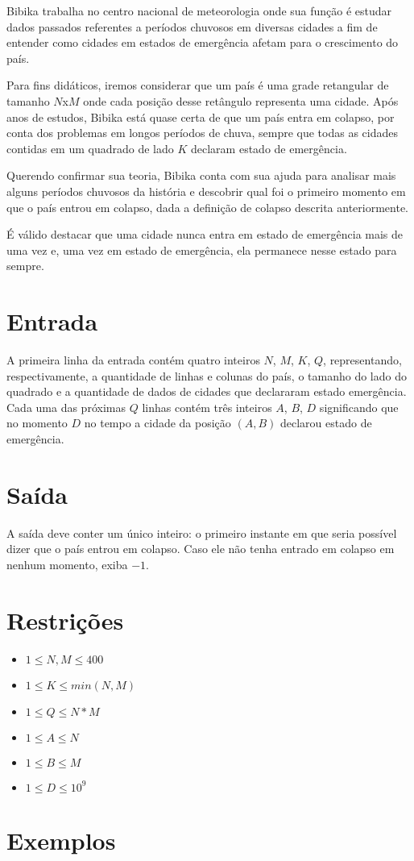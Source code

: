 Bibika trabalha no centro nacional de meteorologia onde sua função é estudar dados passados referentes a períodos chuvosos em diversas cidades a
fim de entender como cidades em estados de emergência afetam para o crescimento do país.

Para fins didáticos, iremos considerar que um país é uma grade retangular de tamanho $N$x$M$ onde cada posição desse retângulo representa uma cidade.
Após anos de estudos, Bibika está quase certa de que um país entra em colapso, por conta dos problemas em longos períodos de chuva, sempre que todas
as cidades contidas em um quadrado de lado $K$ declaram estado de emergência.

Querendo confirmar sua teoria, Bibika conta com sua ajuda para analisar mais alguns períodos chuvosos da história e descobrir qual foi o primeiro momento
em que o país entrou em colapso, dada a definição de colapso descrita anteriormente.

É válido destacar que uma cidade nunca entra em estado de emergência mais de uma vez e, uma vez em estado de emergência, ela permanece nesse estado para sempre.

\section*{Entrada}

A primeira linha da entrada contém quatro inteiros $N$, $M$, $K$, $Q$, representando, respectivamente, a quantidade de linhas e colunas do país,
o tamanho do lado do quadrado e a quantidade de dados de cidades que declararam estado emergência.
Cada uma das próximas $Q$ linhas contém três inteiros $A$, $B$, $D$ significando que no momento $D$ no tempo a cidade da posição $(A,B)$ declarou estado
de emergência.

\section*{Saída}

A saída deve conter um único inteiro: o primeiro instante em que seria possível dizer que o país entrou em colapso. 
Caso ele não tenha entrado em colapso em nenhum momento, exiba $-1$.

\section*{Restrições}

\begin{itemize}
\item $1 \leq N, M \leq 400$
\item $1 \leq K \leq min(N, M)$
\item $1 \leq Q \leq N*M$
\item $1 \leq A \leq N$
\item $1 \leq B \leq M$
\item $1 \leq D \leq 10^9$
\end{itemize}


\section*{Exemplos}

\exemplo
